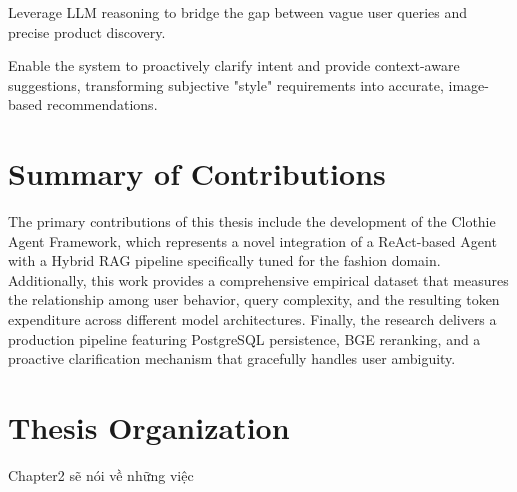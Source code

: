 Leverage LLM reasoning to bridge the gap between vague user queries and precise product discovery.

Enable the system to proactively clarify intent and provide context-aware suggestions, transforming subjective "style" requirements into accurate, image-based recommendations.

\section{Summary of Contributions}

The primary contributions of this thesis include the development of the Clothie Agent Framework, which represents a novel integration of a ReAct-based Agent with a Hybrid RAG pipeline specifically tuned for the fashion domain. Additionally, this work provides a comprehensive empirical dataset that measures the relationship among user behavior, query complexity, and the resulting token expenditure across different model architectures. Finally, the research delivers a production pipeline featuring PostgreSQL persistence, BGE reranking, and a proactive clarification mechanism that gracefully handles user ambiguity.

\section{Thesis Organization}

Chapter2 sẽ nói về những việc
 
